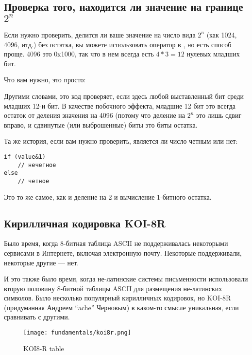 
\subsection{Проверка того, находится ли значение на границе $2^n$}

Если нужно проверить, делится ли ваше значение на число вида 
$2^n$ (как 1024, 4096, итд.) без остатка,
вы можете использовать оператор \TT{\%} в \CCpp, но есть способ проще.
4096 это 0x1000, так что в нем всегда есть $4*3=12$ нулевых младших бит.

Что вам нужно, это просто:



Другими словами, это код проверяет, если здесь любой выставленный бит среди младших 12-и бит.
В качестве побочного эффекта, младшие 12 бит это всегда остаток от деления значения на 4096 (потому что деление на $2^n$
это лишь сдвиг вправо, и сдвинутые (или выброшенные) биты это биты остатка.

Та же история, если вам нужно проверить, является ли число четным или нет:

\begin{lstlisting}[style=customc]
if (value&1)
	// нечетное
else
	// четное
\end{lstlisting}

Это то же самое, как и деление на 2 и вычисление 1-битного остатка.

\subsection{Кирилличная кодировка KOI-8R}

Было время, когда 8-битная таблица \ac{ASCII} не поддерживалась некоторыми сервисами в Интернете, включая электронную почту.
Некоторые поддерживали, некоторые другие --- нет.

И это также было время, когда не-латинские системы письменности использовали вторую половину 8-битной таблицы ASCII
для размещения не-латинских символов.
Было несколько популярный кирилличных кодировок, но KOI-8R (придуманная Андреем ``ache'' Черновым)
в каком-то смысле уникальная, если сравнивать с другими.

\begin{figure}[H]
\centering
\texttt{[image: fundamentals/koi8r.png]}
\caption{KOI8-R table}
\end{figure}

